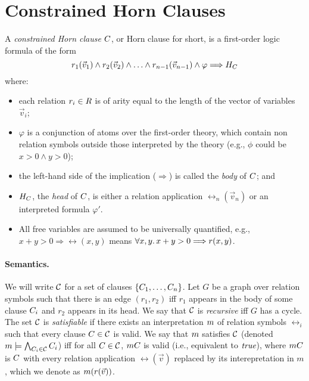 \documentclass{amsart}
\theoremstyle{definition}
\theoremstyle{remark}
\numberwithin{equation}{section}
\begin{document}
\section{Constrained Horn Clauses}
A \emph{constrained Horn clause} $C$, or Horn clause for
short, is a first-order logic formula of the form
\[
r_1(\vec{v}_1) \land r_2(\vec{v}_2) \land \ldots \land r_{n-1}(\vec{v}_{n-1})
\land \varphi \Longrightarrow H_C
\]
where:
\begin{itemize}
  \item each relation $r_i \in R$ is of arity  equal to the length of the
    vector of variables $\vec{v}_i$;
  \item $\varphi$ is a conjunction of atoms over the first-order theory, which contain non relation symbols outside those interpreted by the theory (e.g., $\phi$ could be $x > 0 \land y > 0$);
  \item the left-hand side of the implication ($\Longrightarrow$) is called the
    \emph{body} of $C$; and
  \item $H_C$, the \emph{head} of $C$, is either a relation application
    $\rel_n(\vec{v}_n)$ or an interpreted formula $\varphi'$.
  \item  All free variables
  are assumed to be universally quantified, e.g., $x+y > 0
  \Longrightarrow \rel(x,y)$ means $\forall x,y \ldotp x + y > 0
  \Longrightarrow r(x,y)$.
\end{itemize}

%
%


\paragraph{Semantics.}
We will write $\mathcal{C}$ for a set of clauses $\{C_1,\ldots,C_n\}$.
Let $G$ be a graph over relation symbols such that
there is an edge $(r_1,r_2)$ iff $r_1$ appears in the body of
some clause $C_i$ and $r_2$ appears in its head.
We say that $\mathcal{C}$ is \emph{recursive} iff $G$ has a cycle.
The set $\mathcal{C}$ is \emph{satisfiable} if
there exists an interpretation $m$ of relation symbols $\rel_i$ such that every clause
$C \in \mathcal{C}$ is valid.
We say that $m$ satisfies $\mathcal{C}$ (denoted $m\models \bigwedge_{C_i \in \mathcal{C}} C_i$)
iff for all
$C \in \mathcal{C}$, $m C$ is valid (i.e., equivalent to $\emph{true}$),
where $m C$ is $C$ with every relation application $\rel(\vec{v})$
replaced by its interepretation in $m$, which we denote as $m(r(\vec{v}))$.
\end{document}
